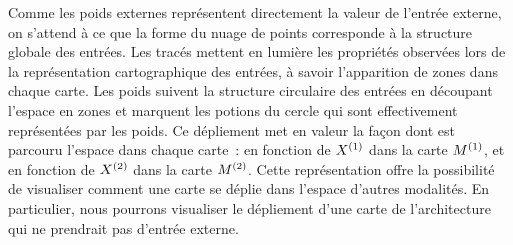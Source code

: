 \documentclass[../main]{subfiles}
\begin{document}
Comme les poids externes représentent directement la valeur de l'entrée externe, on s'attend à ce que la forme du nuage de points corresponde à la structure globale des entrées.
Les tracés mettent en lumière les propriétés observées lors de la représentation cartographique des entrées, à savoir l'apparition de zones dans chaque carte. 
Les poids suivent la structure circulaire des entrées en découpant l'espace en zones et marquent les potions du cercle qui sont effectivement représentées par les poids.
Ce dépliement met en valeur la façon dont est parcouru l'espace dans chaque carte~: en fonction de $X^{({1})}$ dans la carte $M^{({1})}$, et en fonction de $X^{({2})}$ dans la carte $M^{({2})}$.
Cette représentation offre la possibilité  de visualiser comment une carte se déplie dans l'espace d'autres modalités. En particulier, nous pourrons visualiser le dépliement d'une carte de l'architecture qui ne prendrait pas d'entrée externe.
\end{document}
